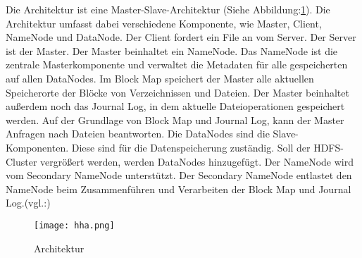Die Architektur ist eine Master-Slave-Architektur (Siehe Abbildung:\ref{fig:Architektur}). Die Architektur umfasst dabei verschiedene Komponente, wie Master, Client, NameNode und DataNode. Der Client fordert ein File an vom Server. Der Server ist der Master. Der Master beinhaltet ein NameNode. Das NameNode ist die zentrale Masterkomponente und verwaltet die Metadaten für alle gespeicherten auf allen DataNodes. Im Block Map speichert der Master alle aktuellen Speicherorte der Blöcke von Verzeichnissen und Dateien. Der Master beinhaltet außerdem noch das Journal Log, in dem aktuelle Dateioperationen gespeichert werden. Auf der Grundlage von Block Map und Journal Log, kann der Master Anfragen nach Dateien beantworten. Die DataNodes sind die Slave-Komponenten. Diese sind für die Datenspeicherung zuständig. Soll der HDFS-Cluster vergrößert werden, werden DataNodes hinzugefügt. Der NameNode wird vom Secondary NameNode unterstützt. Der Secondary NameNode entlastet den NameNode beim Zusammenführen und Verarbeiten der Block Map und Journal Log.(vgl.:\cite{uwe})

\begin{figure}[h!]
    \centering
    \texttt{[image: hha.png]}
    \caption{Architektur\cite{uwes}}
    \label{fig:Architektur}
  \end{figure}

  


